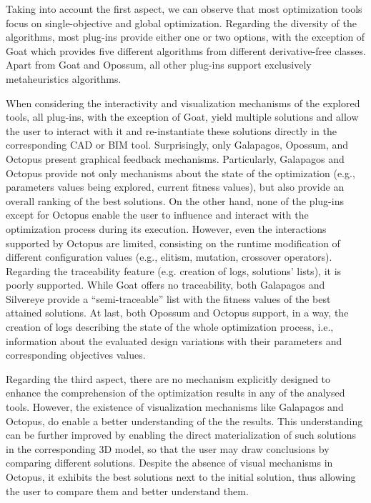 	Taking into account the first aspect, we can observe that most optimization tools focus on single-objective and global optimization. Regarding the diversity of the algorithms, most plug-ins provide either one or two options, with the exception of Goat which provides five different algorithms from different derivative-free classes. Apart from Goat and Opossum, all other plug-ins support exclusively metaheuristics algorithms.
	
	When considering the interactivity and visualization mechanisms of the explored tools, all plug-ins, with the exception of Goat, yield multiple solutions and allow the user to interact with it and re-instantiate these solutions directly in the corresponding \ac{CAD} or \ac{BIM} tool. Surprisingly, only Galapagos, Opossum, and Octopus present graphical feedback mechanisms. Particularly, Galapagos and Octopus provide not only mechanisms about the state of the optimization (e.g., parameters values being explored, current fitness values), but also provide an overall ranking of the best solutions. On the other hand, none of the plug-ins except for Octopus enable the user to influence and interact with the optimization process during its execution. However, even the interactions supported by Octopus are limited, consisting on the runtime modification of different configuration values (e.g., elitism, mutation, crossover operators). Regarding the traceability feature (e.g. creation of logs, solutions' lists), it is poorly supported. While Goat offers no traceability, both Galapagos and Silvereye provide a ``semi-traceable'' list with the fitness values of the best attained solutions. At last, both Opossum and Octopus support, in a way, the creation of logs describing the state of the whole optimization process, i.e., information about the evaluated design variations with their parameters and corresponding objectives values.
	
	Regarding the third aspect, there are no mechanism explicitly designed to enhance the comprehension of the optimization results in any of the analysed tools. However, the existence of visualization mechanisms like Galapagos and Octopus, do enable a better understanding of the the results. This understanding can be further improved by enabling the direct materialization of such solutions in the corresponding 3D model, so that the user may draw conclusions by comparing different solutions. Despite the absence of visual mechanisms in Octopus, it exhibits the best solutions next to the initial solution, thus allowing the user to compare them and better understand them.
	
